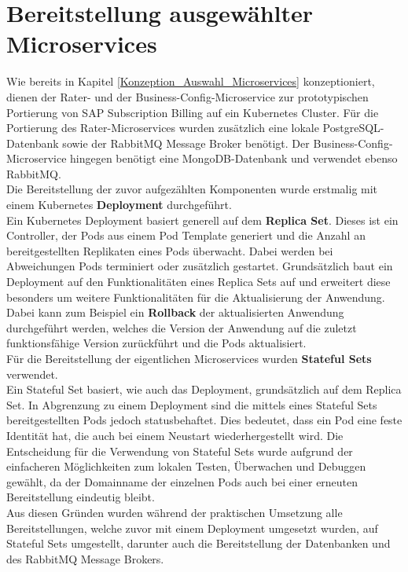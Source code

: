 \section{Bereitstellung ausgewählter Microservices}
\label{Umsetzung_Bereitstellung_Microservices}
Wie bereits in Kapitel \ref{Konzeption_Auswahl_Microservices} konzeptioniert, dienen der Rater- und der Business-Config-Microservice zur prototypischen Portierung von SAP Subscription Billing auf ein Kubernetes Cluster. Für die Portierung des Rater-Microservices wurden zusätzlich eine lokale PostgreSQL-Datenbank sowie der RabbitMQ Message Broker benötigt. Der Business-Config-Microservice hingegen benötigt eine MongoDB-Datenbank und verwendet ebenso RabbitMQ. \\
Die Bereitstellung der zuvor aufgezählten Komponenten wurde erstmalig mit einem Kubernetes \textbf{Deployment} durchgeführt.\\
Ein Kubernetes Deployment basiert generell auf dem \textbf{Replica Set}. Dieses ist ein Controller, der Pods aus einem Pod Template generiert und die Anzahl an bereitgestellten Replikaten eines Pods überwacht. Dabei werden bei Abweichungen Pods terminiert oder zusätzlich gestartet. Grundsätzlich baut ein Deployment auf den Funktionalitäten eines Replica Sets auf und erweitert diese besonders um weitere Funktionalitäten für die Aktualisierung der Anwendung. Dabei kann zum Beispiel ein \textbf{Rollback} der aktualisierten Anwendung durchgeführt werden, welches die Version der Anwendung auf die zuletzt funktionsfähige Version zurückführt und die Pods aktualisiert.\autocite[Vgl.][S. 118, 276]{Luksa.2018}
\\
Für die Bereitstellung der eigentlichen Microservices wurden \textbf{Stateful Sets} verwendet.\\
Ein Stateful Set basiert, wie auch das Deployment, grundsätzlich auf dem Replica Set. In Abgrenzung zu einem Deployment sind die mittels eines Stateful Sets bereitgestellten Pods jedoch statusbehaftet. Dies bedeutet, dass ein Pod eine feste Identität hat, die auch bei einem Neustart wiederhergestellt wird.\autocite[Vgl.][S. 311-312]{Luksa.2018} Die Entscheidung für die Verwendung von Stateful Sets wurde aufgrund der einfacheren Möglichkeiten zum lokalen Testen, Überwachen und Debuggen gewählt, da der Domainname der einzelnen Pods auch bei einer erneuten Bereitstellung eindeutig bleibt.\\
Aus diesen Gründen wurden während der praktischen Umsetzung alle Bereitstellungen, welche zuvor mit einem Deployment umgesetzt wurden, auf Stateful Sets umgestellt, darunter auch die Bereitstellung der Datenbanken und des RabbitMQ Message Brokers.\\
